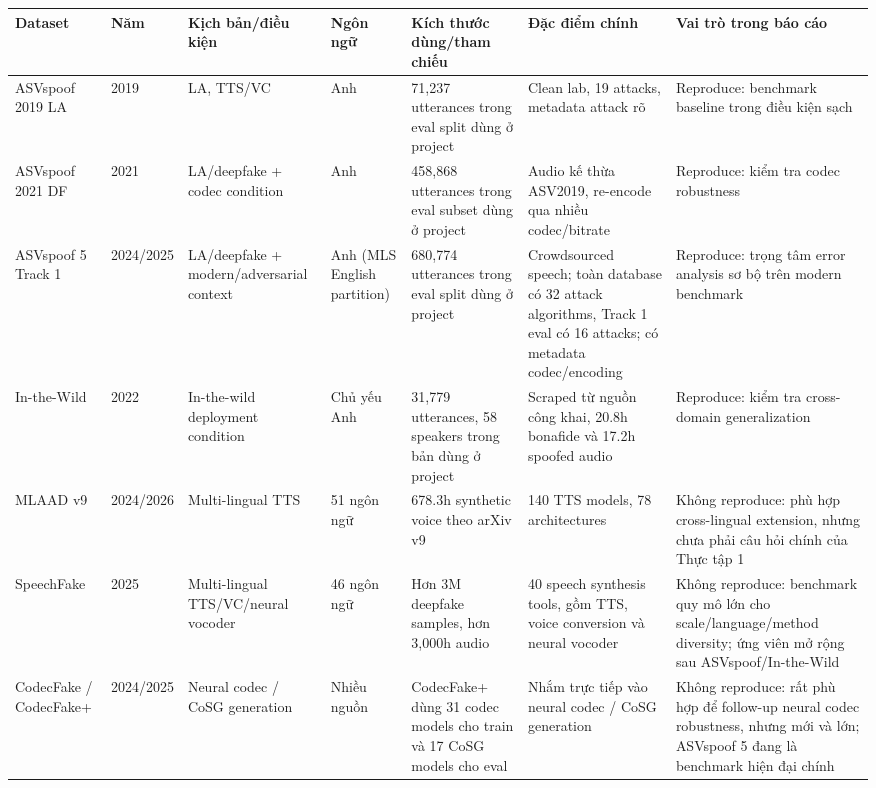 \begin{table}[H]
    \centering
    \footnotesize
    \begin{adjustbox}{width=\textwidth}
    \begin{tabular}{p{2.4cm}|p{1.5cm}|p{2.2cm}|p{1.5cm}|p{3.4cm}|p{3.8cm}|p{4.2cm}}
        \textbf{Dataset} & \textbf{Năm} & \textbf{Kịch bản/điều kiện} & \textbf{Ngôn ngữ} & \textbf{Kích thước dùng/tham chiếu} & \textbf{Đặc điểm chính} & \textbf{Vai trò trong báo cáo}
        \\ \hline
        ASVspoof 2019 LA & 2019 & LA, TTS/VC & Anh & 71,237 utterances trong eval split dùng ở project & Clean lab, 19 attacks, metadata attack rõ & Reproduce: benchmark baseline trong điều kiện sạch
        \\ \hline
        ASVspoof 2021 DF & 2021 & LA/deepfake + codec condition & Anh & 458,868 utterances trong eval subset dùng ở project & Audio kế thừa ASV2019, re-encode qua nhiều codec/bitrate & Reproduce: kiểm tra codec robustness
        \\ \hline
        ASVspoof 5 Track 1 & 2024/2025 & LA/deepfake + modern/adversarial context & Anh (MLS English partition) & 680,774 utterances trong eval split dùng ở project & Crowdsourced speech; toàn database có 32 attack algorithms, Track 1 eval có 16 attacks; có metadata codec/encoding & Reproduce: trọng tâm error analysis sơ bộ trên modern benchmark \cite{asvspoof5_design,asvspoof5_eval}
        \\ \hline
        In-the-Wild & 2022 & In-the-wild deployment condition & Chủ yếu Anh & 31,779 utterances, 58 speakers trong bản dùng ở project & Scraped từ nguồn công khai, 20.8h bonafide và 17.2h spoofed audio & Reproduce: kiểm tra cross-domain generalization \cite{in_the_wild}
        \\ \hline
        MLAAD v9 & 2024/2026 & Multi-lingual TTS & 51 ngôn ngữ & 678.3h synthetic voice theo arXiv v9 & 140 TTS models, 78 architectures & Không reproduce: phù hợp cross-lingual extension, nhưng chưa phải câu hỏi chính của Thực tập 1 \cite{mlaad}
        \\ \hline
        SpeechFake & 2025 & Multi-lingual TTS/VC/neural vocoder & 46 ngôn ngữ & Hơn 3M deepfake samples, hơn 3,000h audio & 40 speech synthesis tools, gồm TTS, voice conversion và neural vocoder & Không reproduce: benchmark quy mô lớn cho scale/language/method diversity; ứng viên mở rộng sau ASVspoof/In-the-Wild \cite{speechfake}
        \\ \hline
        CodecFake / CodecFake+ & 2024/2025 & Neural codec / CoSG generation & Nhiều nguồn & CodecFake+ dùng 31 codec models cho train và 17 CoSG models cho eval & Nhắm trực tiếp vào neural codec / CoSG generation & Không reproduce: rất phù hợp để follow-up neural codec robustness, nhưng mới và lớn; ASVspoof 5 đang là benchmark hiện đại chính \cite{codecfake,codecfakeplus}

\end{tabular}
\end{adjustbox}
\end{table}
